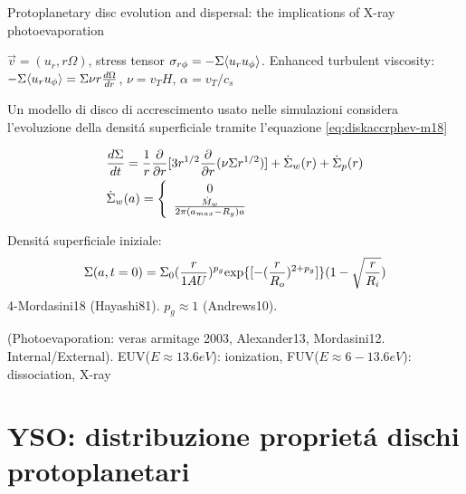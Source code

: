 \begin{workout}
Protoplanetary disc evolution and dispersal: the implications of X-ray photoevaporation
\end{workout}

\begin{workout}
$\vec{v}=(u_r,r\Omega)$, stress tensor $\sigma_{r\phi}=-\Sigma\langle u_ru_{\phi} \rangle$.
Enhanced turbulent viscosity: $-\Sigma\langle u_ru_{\phi} \rangle=\Sigma\nu r\frac{d \Omega}{d r}$, $\nu=v_TH$, $\alpha=v_T/c_s$
\end{workout}

\begin{workout}
Un modello di disco  di accrescimento usato nelle simulazioni considera l'evoluzione della densit\'a superficiale tramite l'equazione \eqref{eq:diskaccrphev-m18}

\begin{align}
&\frac{d \Sigma}{d t}=\frac{1}{r}\frac{\partial}{\partial r}[3r^{1/2}\frac{\partial}{\partial r}(\nu\Sigma r^{1/2})]+\dot{\Sigma}_w(r)+\dot{\Sigma}_p(r)\label{eq:diskaccrphev-m18}\\
&\dot{\Sigma}_w(a)=\left\{\begin{array}{c}0\\\frac{\dot{M}_w}{2\pi(a_{max}-R_g)a}\\\end{array}\right.
\end{align}

Densit\'a superficiale iniziale:
\begin{equation}
\Sigma(a,t=0)=\Sigma_0(\frac{r}{1AU})^{p_g}\text{exp}\{[-(\frac{r}{R_o})^{2+p_g}]\}(1-\sqrt{\frac{r}{R_i}})
\end{equation}
4-Mordasini18 (Hayashi81). $p_g\approx1$ (Andrews10).
\end{workout}


\begin{workout}
(Photoevaporation: veras armitage 2003, Alexander13, Mordasini12. Internal/External).
EUV($E\approx13.6eV$): ionization, FUV($E\approx6-13.6eV$): dissociation, X-ray
\end{workout}

\section{YSO: distribuzione propriet\'a dischi protoplanetari}

